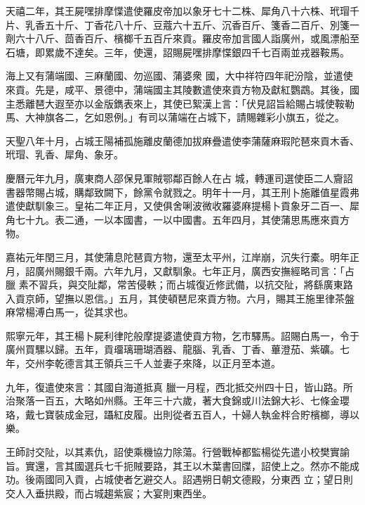 \begin{pinyinscope}
 天禧二年，其王屍嘿排摩惵遣使羅皮帝加以象牙七十二株、犀角八十六株、玳瑁千片、乳香五十斤、丁香花八十斤、豆蔻六十五斤、沉香百斤、箋香二百斤、別箋一劑六十八斤、茴香百斤、檳榔千五百斤來貢。羅皮帝加言國人詣廣州，或風漂船至石塘，即累歲不達矣。三年，使還，詔賜屍嘿排摩惵銀四千七百兩並戎器鞍馬。



 海上又有蒲端國、三麻蘭國、勿巡國、蒲婆衆
 國，大中祥符四年祀汾陰，並遣使來貢。先是，咸平、景德中，蒲端國主其陵數遣使來貢方物及獻紅鸚鵡。其後，國主悉離琶大遐至亦以金版鐫表來上，其使已絮漢上言：「伏見詔旨給賜占城使鞍勒馬、大神旗各二，乞如恩例。」有司以蒲端在占城下，請賜雜彩小旗五，從之。



 天聖八年十月，占城王陽補孤施離皮蘭德加拔麻疊遣使李蒲薩麻瑕陀琶來貢木香、玳瑁、乳香、犀角、象牙。



 慶曆元年九月，廣東商人邵保見軍賊鄂鄰百餘人在占
 城，轉運司選使臣二人齎詔書器幣賜占城，購鄰致闕下，餘黨令就戮之。明年十一月，其王刑卜施離值星霞弗遣使獻馴象三。皇祐二年正月，又使俱舍唎波微收羅婆麻提楊卜貢象牙二百一、犀角七十九。表二通，一以本國書，一以中國書。五年四月，其使蒲思馬應來貢方物。



 嘉祐元年閏三月，其使蒲息陀琶貢方物，還至太平州，江岸崩，沉失行橐。明年正月，詔廣州賜銀千兩。六年九月，又獻馴象。七年正月，廣西安撫經略司言：「占臘
 素不習兵，與交阯鄰，常苦侵軼；而占城復近修武備，以抗交阯，將繇廣東路入貢京師，望撫以恩信。」五月，其使頓琶尼來貢方物。六月，賜其王施里律茶盤麻常楊溥白馬一，從其求也。



 熙寧元年，其王楊卜屍利律陀般摩提婆遣使貢方物，乞市驛馬。詔賜白馬一，令于廣州買騾以歸。五年，貢璢璃珊瑚酒器、龍腦、乳香、丁香、蓽澄茄、紫礦。七年，交州李乾德言其王領兵三千人並妻子來降，以正月至本道。



 九年，復遣使來言：其國自海道抵真
 臘一月程，西北抵交州四十日，皆山路。所治聚落一百五，大略如州縣。王年三十六歲，著大食錦或川法錦大衫、七條金瓔珞，戴七寶裝成金冠，躡紅皮履。出則從者五百人，十婦人執金柈合貯檳榔，導以樂。



 王師討交阯，以其素仇，詔使乘機協力除蕩。行營戰棹都監楊從先遣小校樊實諭旨。實還，言其國選兵七千扼賊要路，其王以木葉書回牒，詔使上之。然亦不能成功。後兩國同入貢，占城使者乞避交人。詔遇朔日朝文德殿，分東西
 立；望日則交人入垂拱殿，而占城趨紫宸；大宴則東西坐。




\end{pinyinscope}
